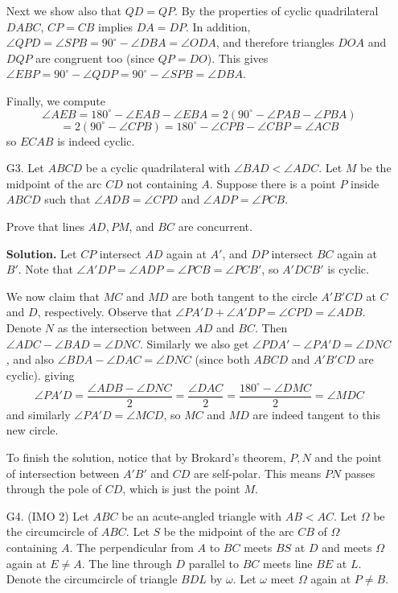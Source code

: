 \documentclass[11pt,a4paper]{article}
\begin{document}
\begin{enumerate}
    	Next we show also that $QD = QP$. 
    	By the properties of cyclic quadrilateral $DABC$, 
    	$CP=CB$ implies $DA=DP$. 
    	In addition, $\angle QPD = \angle SPB = 90^{\circ} - \angle DBA
    	= \angle ODA$, 
    	and therefore triangles $DOA$ and $DQP$ are congruent too 
    	(since $QP = DO$). 
    	This gives 
    	$\angle EBP = 90^{\circ} - \angle QDP = 90^{\circ} - \angle SPB = \angle DBA$. 
    	
    	Finally, we compute 
    	\[
    	\angle AEB
    	=180^{\circ} - \angle EAB  -\angle EBA
    	=2(90^{\circ} - \angle PAB - \angle PBA)
    	\]\[
    	=2(90^{\circ} - \angle CPB)
    	=180^{\circ} - \angle CPB - \angle CBP
    	=\angle ACB
    	\]
    	so $ECAB$ is indeed cyclic. 
    	
    	\item [G3. ] 
    	Let $ABCD$ be a cyclic quadrilateral with $\angle BAD < \angle ADC$. Let $M$ be the midpoint of the arc $CD$ not containing $A$. Suppose there is a point $P$ inside $ABCD$ such that $\angle ADB = \angle CPD$ and $\angle ADP = \angle PCB$.
    	
    	Prove that lines $AD, PM$, and $BC$ are concurrent.
    	
    	\textbf{Solution.}
    	Let $CP$ intersect $AD$ again at $A'$, 
    	and $DP$ intersect $BC$ again at $B'$. 
    	Note that $\angle A'DP = \angle ADP = \angle PCB = \angle PCB'$, 
    	so $A'DCB'$ is cyclic. 
    	
    	We now claim that $MC$ and $MD$ are both tangent to the circle $A'B'CD$ at $C$ and $D$, 
    	respectively. 
    	Observe that $\angle PA'D + \angle A'DP = \angle CPD = \angle ADB$. 
    	Denote $N$ as the intersection between $AD$ and $BC$. 
    	Then $\angle ADC - \angle BAD = \angle DNC$. 
    	Similarly we also get 
    	$\angle PDA' - \angle PA'D = \angle DNC$, 
    	and also $\angle BDA - \angle DAC = \angle DNC$ 
    	(since both $ABCD$ and $A'B'CD$ are cyclic). 
    	giving 
    	\[\angle PA'D = \frac{\angle ADB - \angle DNC}{2} = \frac{\angle DAC}{2}
    	=\frac{180^{\circ} - \angle DMC}{2}
    	=\angle MDC
    	\]
    	and similarly $\angle PA'D = \angle MCD$, 
    	so $MC$ and $MD$ are indeed tangent to this new circle. 
    	
    	To finish the solution, 
    	notice that by Brokard's theorem, $P, N$ and the point of intersection between $A'B'$ and $CD$ are self-polar. 
    	This means $PN$ passes through the pole of $CD$, 
    	which is just the point $M$. 
    	
    	\item [G4.] (IMO 2)
    	Let $ABC$ be an acute-angled triangle with $AB < AC$. Let $\Omega$ be the circumcircle of $ABC$. Let $S$ be the midpoint of the arc $CB$ of $\Omega$ containing $A$. The perpendicular from $A$ to $BC$ meets $BS$ at $D$ and meets $\Omega$ again at $E \neq A$. The line through $D$ parallel to $BC$ meets line $BE$ at $L$. Denote the circumcircle of triangle $BDL$ by $\omega$. Let $\omega$ meet $\Omega$ again at $P \neq B$. 
    	

\end{enumerate}
\end{document}
